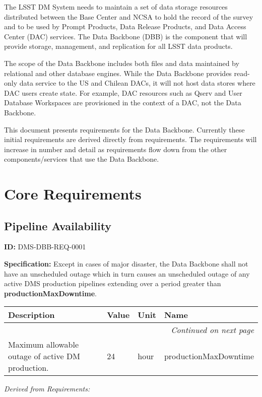 \documentclass[SE,toc]{lsstdoc}
\date{2019-07-16}
\makeatletter
\newcommand{\paramname}[1]{\hspace{0pt}#1}
\newcommand{\unitname}[1]{\hspace{0pt}#1}
\newenvironment{parameters}[0]{%
\setlength\LTleft{0pt}
\setlength\LTright{\fill}
\begin{small}
\begin{longtable}[]{|p{0.49\textwidth}|l|p{0.6in}|p{1.70in}@{}|}

\hline \textbf{Description} & \textbf{Value} & \textbf{Unit} & \textbf{Name} \\ \hline
\endhead

\hline \multicolumn{4}{r}{\emph{Continued on next page}} \\
\endfoot

\hline\hline
\endlastfoot
}{%
\hline
\end{longtable}
\end{small}
}
\makeatother
\begin{document}
\maketitle

The LSST DM System needs to maintain a set of data storage resources
distributed between the Base Center and NCSA to hold the record of
the survey and to be used by Prompt Products, Data Release Products,
and Data Access Center (DAC) services.  The Data Backbone (DBB) is the component that will provide storage, management, and replication for all LSST data products.

The scope of the Data Backbone includes both files and data maintained by relational and other database engines.  While the Data Backbone provides read-only data service to the US and Chilean DACs, it will not host data stores where DAC users create state.  For example,
DAC resources such as Qserv and User Database Workspaces are provisioned in the context of a DAC, not the Data Backbone.

This document presents requirements for the Data Backbone.  Currently these initial requirements are derived directly from  requirements.  The requirements will increase in number and detail
as requirements flow down from the other components/services that use the Data Backbone.

\section{Core Requirements}

\subsection{Pipeline Availability}

\label{DMS-DBB-REQ-0001}
\textbf{ID:} DMS-DBB-REQ-0001

\textbf{Specification:}
Except in cases of major disaster, the Data Backbone shall not have an unscheduled outage which in turn causes an unscheduled outage of any active DMS production pipelines extending over a period greater than \textbf{productionMaxDowntime}.

\begin{parameters}
Maximum allowable outage of active DM production.
&
24
&
\unitname{%
hour
}
&
\paramname{%
productionMaxDowntime
} \\\hline
\end{parameters}

\emph{Derived from Requirements:}
\end{document}
